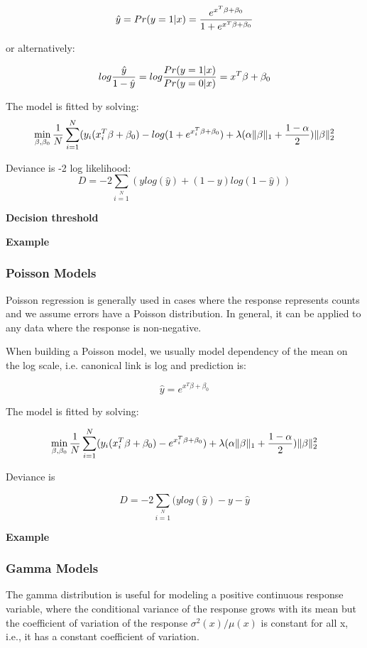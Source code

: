 \documentclass[11pt]{article}
\begin{document}
\[ \hat{y} = Pr(y = 1|x) = {e^{x^T\beta + \beta_0} \over 1 + e^{x^T \beta + \beta_0} } \]

or alternatively:


\[log {\hat{y} \over 1- \hat{y}} = log{Pr(y=1|x) \over Pr(y=0|x)} = x^T \beta + \beta_0\]

The model is fitted by solving:
\[  \min\limits_{\beta,\beta_0} { {1 \over N}\sum\limits_{i=1}\limits^{N}(y_i (x_i^{T}\beta  + \beta_0) - log (1 + e^{x_i^{T}\beta  + \beta_0} )  + \lambda (\alpha \|\beta \|_1 + {1-\alpha \over 2}) \|\beta\|_2^2} \]

Deviance is -2 log likelihood:
\[D = -2\sum\limits_{i=1}\limits^{N}{(y log(\hat{y}) + (1 - y)log(1-\hat{y})  )}\]

\textbf{Decision threshold}

\textbf{Example}

\subsubsection{Poisson Models}
Poisson regression is generally used in cases where the response represents counts and we assume errors have a Poisson distribution. In general, it can be applied to any data where the response is non-negative. 

When building a Poisson model, we usually model dependency of the mean on the log scale, i.e. canonical link is log and prediction is:

\[\hat{y} = e^{x^T\beta + \beta_0}\]

The model is fitted by solving:

\[  \min\limits_{\beta,\beta_0} { {1 \over N}\sum\limits_{i=1}\limits^{N}(y_i (x_i^{T}\beta  + \beta_0) - e^{x_i^{T}\beta  + \beta_0})  + \lambda (\alpha \|\beta \|_1 + {1-\alpha \over 2}) \| \beta \|_2^2} \]

Deviance is 

\[D = -2\sum\limits_{i=1}\limits^{N}{(y log(\hat{y}) - y - \hat{y}}\]


\textbf{Example}

\subsubsection{Gamma Models}
The gamma distribution is useful for modeling a positive continuous response variable, where the conditional variance of the response grows with its mean but  the coefficient of variation of the response $\sigma^2(x)/μ(x)$ is constant for all x,  i.e., it has a constant coefficient of variation.
\end{document}
